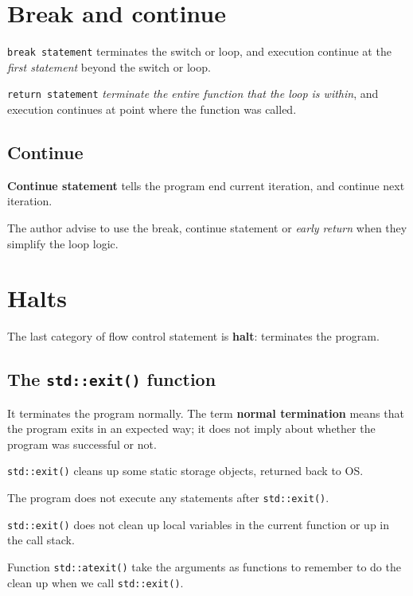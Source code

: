 \documentclass[
  letterpaper,
  DIV=11,
  numbers=noendperiod]{scrreprt}
\begin{document}
\hypertarget{break-and-continue}{%
\section{Break and continue}\label{break-and-continue}}

\texttt{break\ statement} terminates the switch or loop, and execution
continue at the \emph{first statement} beyond the switch or loop.

\texttt{return\ statement} \emph{terminate the entire function that the
loop is within}, and execution continues at point where the function was
called.

\hypertarget{continue}{%
\subsection{Continue}\label{continue}}

\textbf{Continue statement} tells the program end current iteration, and
continue next iteration.

The author advise to use the break, continue statement or \emph{early
return} when they simplify the loop logic.

\hypertarget{sec-halts}{%
\section{Halts}\label{sec-halts}}

The last category of flow control statement is \textbf{halt}: terminates
the program.

\hypertarget{the-stdexit-function}{%
\subsection{\texorpdfstring{The \texttt{std::exit()}
function}{The std::exit() function}}\label{the-stdexit-function}}

It terminates the program normally. The term \textbf{normal termination}
means that the program exits in an expected way; it does not imply about
whether the program was successful or not.

\texttt{std::exit()} cleans up some static storage objects, returned
back to OS.

The program does not execute any statements after \texttt{std::exit()}.

\texttt{std::exit()} does not clean up local variables in the current
function or up in the call stack.

Function \texttt{std::atexit()} take the arguments as functions to
remember to do the clean up when we call \texttt{std::exit()}.
\end{document}

